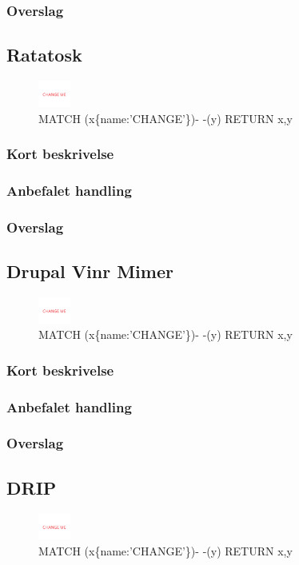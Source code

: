 \documentclass{article}
\begin{document}
\subsubsection{Overslag}


\subsection{Ratatosk}
\begin{figure}[h]
\includegraphics[width=30pt]{CHANGE.PNG}
\caption{MATCH (x\{name:'CHANGE'\})- -(y) RETURN x,y}
\end{figure}
\subsubsection{Kort beskrivelse}
\subsubsection{Anbefalet handling}
\subsubsection{Overslag}


\subsection{Drupal Vinr Mimer}
\begin{figure}[h]
\includegraphics[width=30pt]{CHANGE.PNG}
\caption{MATCH (x\{name:'CHANGE'\})- -(y) RETURN x,y}
\end{figure}
\subsubsection{Kort beskrivelse}
\subsubsection{Anbefalet handling}
\subsubsection{Overslag}


\subsection{DRIP}
\begin{figure}[h]
\includegraphics[width=30pt]{CHANGE.PNG}
\caption{MATCH (x\{name:'CHANGE'\})- -(y) RETURN x,y}
\end{figure}
\end{document}
